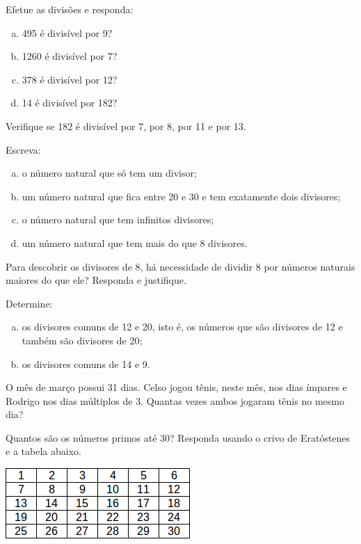 \item Efetue as divisões e responda:
\begin{multicols}{2}
\begin{enumerate}[a)]
	\item 495 é divisível por 9?
	\item 1260 é divisível por 7?
	\item 378 é divisível por 12?
	\item 14 é divisível por 182?
\end{enumerate}
\end{multicols}

\item Verifique se 182 é divisível por 7, por 8, por 11 e por 13.

\item Escreva:
\begin{multicols}{2}
\begin{enumerate}[a)]
	\item o número natural que só tem um divisor;
	\item um número natural que fica entre 20 e 30 e tem exatamente dois divisores;
	\item o número natural que tem infinitos divisores;
	\item um número natural que tem mais do que 8 divisores.
\end{enumerate}
\end{multicols}

\item Para descobrir os divisores de 8, há necessidade de dividir 8 por números naturais maiores do que ele? Responda e justifique.

\item Determine:
\begin{enumerate}[a)]
	\item os divisores comuns de 12 e 20, isto é, os números que são divisores de 12 e também são divisores de 20;
	\item os divisores comuns de 14 e 9.
\end{enumerate}

\item O mês de março possui 31 dias. Celso jogou tênis, neste  mês, nos dias ímpares e Rodrigo nos dias múltiplos de 3. Quantas vezes ambos jogaram tênis no mesmo dia? 

\item Quantos são os números primos até 30? Responda usando o crivo de Eratóstenes e a tabela abaixo.
\begin{center}
\includegraphics[scale=1]{figuras/fig102.png}
\end{center}

